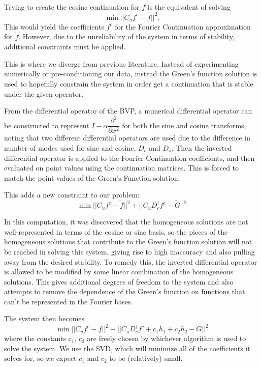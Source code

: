 \documentclass[11pt]{amsart}
\begin{document}
Trying to create the cosine continuation for $f$ is the equivalent of solving
\begin{equation}
\min ||C_u f^c - \tilde{f} ||^2 .
\end{equation}
This would yield the coefficients $f^c$ for the Fourier Continuation approximation for $\tilde{f}$.  However, due to the unreliability of the system in terms of stability, additional constraints must be applied.  

This is where we diverge from previous literature.  Instead of experimenting numerically or pre-conditioning our data, instead the Green's function solution is used to hopefully constrain the system in order get a continuation that is stable under the given operator.  

From the differential operator of the BVP, a numerical differential operator can be constructed to represent $I-\alpha \dfrac{\partial ^2 }{\partial x^2}$ for both the sine and cosine transforms, noting that two different differential operators are used due to the difference in number of modes used for sine and cosine, $D_c$ and $D_s$. Then the inverted differential operator is applied to the Fourier Continuation coefficients, and then evaluated on point values using the continuation matrices. This is forced to match the point values of the Green's Function solution.

This adds a new constraint to our problem: 
\begin{equation}
\min ||C_u f^c - \tilde{f}|| ^2 + ||C_u D_c^{\dagger} f^c - \tilde{G}||^2
\end{equation} 

In this computation, it was discovered that the homogeneous solutions are not well-represented in terms of the cosine or sine basis, so the pieces of the homogeneous solutions that contribute to the Green's function solution will not be reached in solving this system, giving rise to high inaccuracy and also pulling away from the desired stability. To remedy this, the inverted differential operator is allowed to be modified by some linear combination of the homogeneous solutions.  This gives additional degrees of freedom to the system and also attempts to remove the dependence of the Green's function on functions that can't be represented in the Fourier bases.  

The system then becomes
\begin{equation}
\min ||C_u f^c - \tilde{f}|| ^2 + ||C_u D_c^{\dagger} f^c +c_1 \tilde{h_1} + c_2 \tilde{h_2} - \tilde{G}||^2
\end{equation}
where the constants $c_1$, $c_2$ are freely chosen by whichever algorithm is used to solve the system.  We use the SVD, which will minimize all of the coefficients it solves for, so we expect $c_1$ and $c_2$ to be (relatively) small.  
\end{document}
